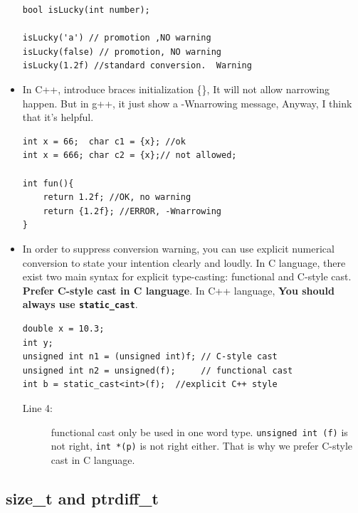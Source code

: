\documentclass[a4paper,11pt,twoside]{book}
\begin{document}
\begin{itemize}
\begin{lstlisting}[numbers=none]
bool isLucky(int number);

isLucky('a') // promotion ,NO warning
isLucky(false) // promotion, NO warning
isLucky(1.2f) //standard conversion.  Warning
\end{lstlisting}
	
	\item In C++, introduce braces initialization \{\}, It will not allow narrowing happen. But in g++, it just show a -Wnarrowing message, Anyway, I think that it's helpful.
\begin{lstlisting}[numbers=none]
int x = 66;  char c1 = {x}; //ok	
int x = 666; char c2 = {x};// not allowed;

int fun(){
	return 1.2f; //OK, no warning
	return {1.2f}; //ERROR, -Wnarrowing
}
\end{lstlisting}
	
	\item In order to suppress conversion warning, you can use explicit numerical conversion to state your intention clearly and loudly. In C language, there exist two main syntax for explicit type-casting: functional and C-style cast.  \textbf{Prefer C-style cast in C language}. In C++ language, \textbf{You should always use \texttt{static\_cast}}.
	
\begin{lstlisting}[]
double x = 10.3;
int y;
unsigned int n1 = (unsigned int)f; // C-style cast
unsigned int n2 = unsigned(f);     // functional cast
int b = static_cast<int>(f);  //explicit C++ style
\end{lstlisting}
	\begin{description}
		\item[Line 4:] functional cast only be used in one word type. \texttt{unsigned int (f)} is not right, \texttt{int *(p)} is not right either. That is why we prefer C-style cast in C language.
	\end{description}
\end{itemize}

\subsection{size\_t and ptrdiff\_t}
\end{document}
